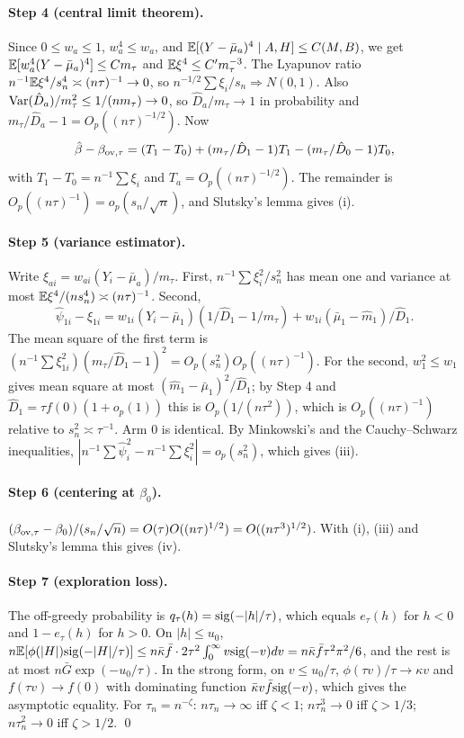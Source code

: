\paragraph{Step 4 (central limit theorem).} Since $0\le w_a\le1$, $w_a^4\le
w_a$, and $\mathbb{E}[(Y-\bar\mu_a)^4\mid A,H]\le C(M,B)$, we get
$\mathbb{E}[w_a^4(Y-\bar\mu_a)^4]\le Cm_\tau$ and $\mathbb{E}\xi^4\le C'm_\tau^{-3}$. The
Lyapunov ratio $n^{-1}\mathbb{E}\xi^4/s_n^4\asymp(n\tau)^{-1}\to0$, so
$n^{-1/2}\sum\xi_i/s_n\Rightarrow N(0,1)$. Also
$\mathrm{Var}(\hat D_a)/m_\tau^2\le1/(nm_\tau)\to0$, so $\hat D_a/m_\tau\to1$ in
probability and $m_\tau/\hat D_a-1=O_p((n\tau)^{-1/2})$. Now
\[
\hat\beta-\beta_{\mathrm{ov},\tau}=(T_1-T_0)+(m_\tau/\hat D_1-1)T_1-(m_\tau/\hat D_0-1)T_0,
\]
with $T_1-T_0=n^{-1}\sum\xi_i$ and $T_a=O_p((n\tau)^{-1/2})$. The remainder is
$O_p((n\tau)^{-1})=o_p(s_n/\sqrt n)$, and Slutsky's lemma gives (i).

\paragraph{Step 5 (variance estimator).} Write
$\xi_{ai}=w_{ai}(Y_i-\bar\mu_a)/m_\tau$. First, $n^{-1}\sum\xi_i^2/s_n^2$ has
mean one and variance at most $\mathbb{E}\xi^4/(ns_n^4)\asymp(n\tau)^{-1}$. Second,
\[
\hat\psi_{1i}-\xi_{1i}=w_{1i}(Y_i-\bar\mu_1)(1/\hat D_1-1/m_\tau)+w_{1i}(\bar\mu_1-\hat m_1)/\hat D_1 .
\]
The mean square of the first term is
$(n^{-1}\sum\xi_{1i}^2)(m_\tau/\hat D_1-1)^2=O_p(s_n^2)O_p((n\tau)^{-1})$.
For the second, $w_1^2\le w_1$ gives mean square at most
$(\hat m_1-\bar\mu_1)^2/\hat D_1$; by Step 4 and $\hat D_1=\tau f(0)(1+o_p(1))$
this is $O_p(1/(n\tau^2))$, which is $O_p((n\tau)^{-1})$ relative to
$s_n^2\asymp\tau^{-1}$. Arm $0$ is identical. By Minkowski's and the
Cauchy--Schwarz inequalities, $|n^{-1}\sum\hat\psi_i^2-n^{-1}\sum\xi_i^2|=o_p(s_n^2)$,
which gives (iii).

\paragraph{Step 6 (centering at $\beta_0$).}
$(\beta_{\mathrm{ov},\tau}-\beta_0)/(s_n/\sqrt n)=O(\tau)O((n\tau)^{1/2})=O((n\tau^3)^{1/2})$.
With (i), (iii) and Slutsky's lemma this gives (iv).

\paragraph{Step 7 (exploration loss).} The off-greedy probability is
$q_\tau(h)=\mathrm{sig}(-|h|/\tau)$, which equals $e_\tau(h)$ for $h<0$ and $1-e_\tau(h)$ for $h>0$. On $|h|\le u_0$,
$n\mathbb{E}[\phi(|H|)\mathrm{sig}(-|H|/\tau)]\le n\bar\kappa\bar f\cdot2\tau^2\int_0^\infty
v\mathrm{sig}(-v)dv=n\bar\kappa\bar f\tau^2\pi^2/6$, and the rest is at most
$n\bar G\exp(-u_0/\tau)$. In the strong form, on $v\le u_0/\tau$,
$\phi(\tau v)/\tau\to\kappa v$ and $f(\tau v)\to f(0)$ with dominating function
$\bar\kappa v\bar f\mathrm{sig}(-v)$, which gives the asymptotic equality. For
$\tau_n=n^{-\zeta}$: $n\tau_n\to\infty$ iff $\zeta<1$; $n\tau_n^3\to0$ iff
$\zeta>1/3$; $n\tau_n^2\to0$ iff $\zeta>1/2$. \qed

